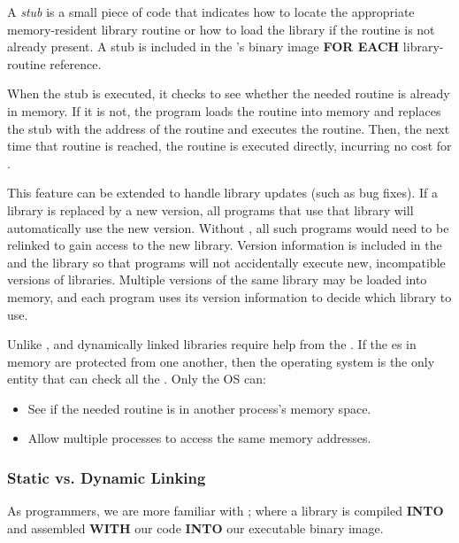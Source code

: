 \begin{definition}[Stub]\label{def:Stub}
  A \emph{stub} is a small piece of code that indicates how to locate the appropriate memory-resident library routine or how to load the library if the routine is not already present.
  A stub is included in the 's binary image \textbf{FOR EACH} library-routine reference.

  When the stub is executed, it checks to see whether the needed routine is already in memory.
  If it is not, the program loads the routine into memory and replaces the stub with the address of the routine and executes the routine.
  Then, the next time that routine is reached, the routine is executed directly, incurring no cost for .
\end{definition}

This feature can be extended to handle library updates (such as bug fixes).
If a library is replaced by a new version, all programs that use that library will automatically use the new version.
Without , all such programs would need to be relinked to gain access to the new library.
Version information is included in the  and the library so that programs will not accidentally execute new, incompatible versions of libraries.
Multiple versions of the same library may be loaded into memory, and each program uses its version information to decide which library to use.

Unlike ,  and dynamically linked libraries require help from the .
If the es in memory are protected from one another, then the operating system is the only entity that can check all the .
Only the OS can:
\begin{itemize}[noitemsep]
\item See if the needed routine is in another process’s memory space.
\item Allow multiple processes to access the same memory addresses.
\end{itemize}

\subsubsection{Static vs. Dynamic Linking}\label{subsubsec:Static_vs_Dynamic_Linking}
As programmers, we are more familiar with ; where a library is compiled \textbf{INTO} and assembled \textbf{WITH} our code \textbf{INTO} our executable binary image.

